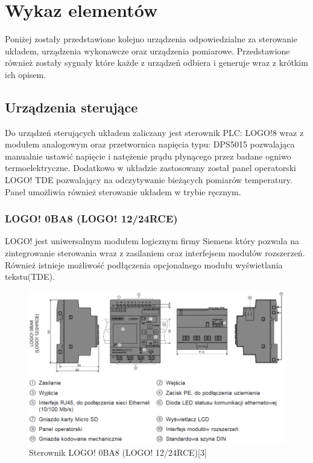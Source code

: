 \documentclass[oneside]{mgr}
\begin{document}
\section{Wykaz elementów}
Poniżej zostały przedstawione kolejno urządzenia odpowiedzialne za sterowanie układem, urządzenia wykonawcze oraz urządzenia pomiarowe. Przedstawione również zostały sygnały które każde z urządzeń odbiera i generuje wraz z krótkim ich opisem.
\subsection{Urządzenia sterujące}
Do urządzeń sterujących układem zaliczany jest sterownik PLC: LOGO!8 wraz z modułem analogowym oraz przetwornica napięcia typu: DPS5015 pozwalająca manualnie ustawić napięcie i natężenie prądu płynącego przez badane ogniwo termoelektryczne. Dodatkowo w układzie zastosowany został panel operatorski LOGO! TDE pozwalający na odczytywanie bieżących pomiarów temperatury. Panel umożliwia również sterowanie układem w trybie ręcznym.

\subsubsection{LOGO! 0BA8 (LOGO! 12/24RCE)}
LOGO! jest uniwersalnym modułem logicznym firmy Siemens który pozwala na zintegrowanie sterowania wraz z zasilaniem oraz interfejsem modułów rozszerzeń. Również istnieje możliwość podłączenia opcjonalnego modułu wyświetlania tekstu(TDE).

\begin{figure}
    \centering
    \includegraphics[width=\textwidth]{Sterownik_LOGO!.PNG}
    \caption{Sterownik LOGO! 0BA8 (LOGO! 12/24RCE)[3]}
\end{figure}
\end{document}
